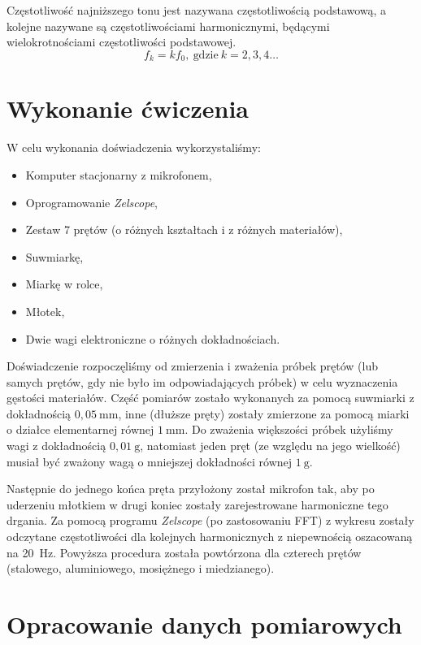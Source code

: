 \documentclass[12pt,a4paper]{article}
\numberwithin{equation}{section}
\begin{document}
Częstotliwość najniższego tonu jest nazywana częstotliwością podstawową, a kolejne nazywane są częstotliwościami harmonicznymi, będącymi wielokrotnościami częstotliwości podstawowej.
\begin{equation}
	f_k = kf_0,~\textrm{gdzie}~k = 2, 3, 4 \ldots
	\label{eq:f_k}
\end{equation}

\pagebreak
\section{Wykonanie ćwiczenia}
W celu wykonania doświadczenia wykorzystaliśmy:
\begin{itemize}
	\item Komputer stacjonarny z mikrofonem,
	\item Oprogramowanie \emph{Zelscope},
	\item Zestaw 7 prętów (o różnych kształtach i z różnych materiałów),
	\item Suwmiarkę,
	\item Miarkę w rolce,
	\item Młotek,
	\item Dwie wagi elektroniczne o różnych dokładnościach.
\end{itemize}

Doświadczenie rozpoczęliśmy od zmierzenia i zważenia próbek prętów (lub samych prętów, gdy nie było im odpowiadających próbek) w celu wyznaczenia gęstości materiałów. Część pomiarów zostało wykonanych za pomocą suwmiarki z dokładnością $0,05~\mathrm{mm}$, inne (dłuższe pręty) zostały zmierzone za pomocą miarki o działce elementarnej równej $1~\mathrm{mm}$. Do zważenia większości próbek użyliśmy wagi z dokładnością $0,01~\mathrm{g}$, natomiast jeden pręt (ze względu na jego wielkość) musiał być zważony wagą o mniejszej dokładności równej $1~\mathrm{g}$.

Następnie do jednego końca pręta przyłożony został mikrofon tak, aby po uderzeniu młotkiem w drugi koniec zostały zarejestrowane harmoniczne tego drgania. Za pomocą programu \emph{Zelscope} (po zastosowaniu FFT) z wykresu zostały odczytane częstotliwości dla kolejnych harmonicznych z niepewnością oszacowaną na 20~Hz. Powyższa procedura została powtórzona dla czterech prętów (stalowego, aluminiowego, mosiężnego i miedzianego).

\pagebreak
\section{Opracowanie danych pomiarowych}
\end{document}
